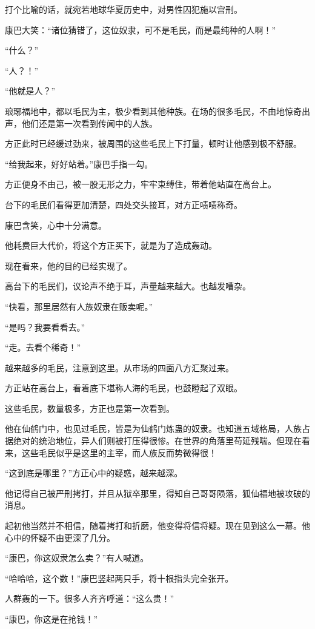 \begin{this_body}
打个比喻的话，就宛若地球华夏历史中，对男性囚犯施以宫刑。

康巴大笑：“诸位猜错了，这位奴隶，可不是毛民，而是最纯种的人啊！”

“什么？”

“人？！”

“他就是人？”

琅琊福地中，都以毛民为主，极少看到其他种族。在场的很多毛民，不由地惊奇出声，他们还是第一次看到传闻中的人族。

方正此时已经缓过劲来，被周围的这些毛民上下打量，顿时让他感到极不舒服。

“给我起来，好好站着。”康巴手指一勾。

方正便身不由己，被一股无形之力，牢牢束缚住，带着他站直在高台上。

台下的毛民们看得更加清楚，四处交头接耳，对方正啧啧称奇。

康巴含笑，心中十分满意。

他耗费巨大代价，将这个方正买下，就是为了造成轰动。

现在看来，他的目的已经实现了。

高台下的毛民们，议论声不绝于耳，声量越来越大。也越发嘈杂。

“快看，那里居然有人族奴隶在贩卖呢。”

“是吗？我要看看去。”

“走。去看个稀奇！”

越来越多的毛民，注意到这里。从市场的四面八方汇聚过来。

方正站在高台上，看着底下堪称人海的毛民，也鼓瞪起了双眼。

这些毛民，数量极多，方正也是第一次看到。

他在仙鹤门中，也见过毛民，皆是为仙鹤门炼蛊的奴隶。也知道五域格局，人族占据绝对的统治地位，异人们则被打压得很惨。在世界的角落里苟延残喘。但现在看来，这些毛民似乎是这里的主宰，而人族反而势微得很！

“这到底是哪里？”方正心中的疑惑，越来越深。

他记得自己被严刑拷打，并且从狱卒那里，得知自己哥哥陨落，狐仙福地被攻破的消息。

起初他当然并不相信，随着拷打和折磨，他变得将信将疑。现在见到这么一幕。他心中的怀疑不由更深了几分。

“康巴，你这奴隶怎么卖？”有人喊道。

“哈哈哈，这个数！”康巴竖起两只手，将十根指头完全张开。

人群轰的一下。很多人齐齐呼道：“这么贵！”

“康巴，你这是在抢钱！”


\end{this_body}

